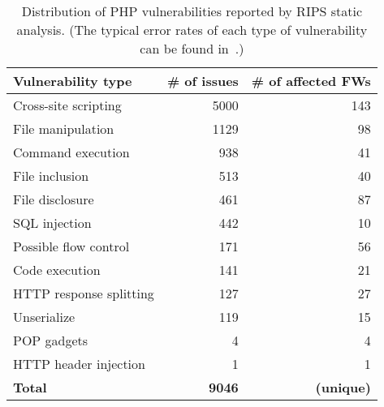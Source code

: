 \documentclass[conference]{./templates/ndss/IEEEtran}
\newcounter{t0d0_counter}
\newcounter{pr00f_counter}
\newcommand{\countfirmwarephpripstotal}{9046}
\newcommand{\countfirmwarephpripscodeexecution}{141}
\newcommand{\countfirmwarephpripshttpresponsesplitting}{127}
\newcommand{\countfirmwarephpripscommandexecution}{938}
\newcommand{\countfirmwarephpripsheaderinjection}{1}
\newcommand{\countfirmwarephpripspossibleflowcontrol}{171}
\newcommand{\countfirmwarephpripsunserialize}{119}
\newcommand{\countfirmwarephpripssqlinjection}{442}
\newcommand{\countfirmwarephpripspopgadgets}{4}
\newcommand{\countfirmwarephpripsfiledisclosure}{461}
\newcommand{\countfirmwarephpripsfilemanipulation}{1129}
\newcommand{\countfirmwarephpripsfileinclusion}{513}
\newcommand{\countfirmwarephpripscrosssitescripting}{5000}
\newcommand{\countfirmwarefilesphpripscodeexecution}{21}
\newcommand{\countfirmwarefilesphpripshttpresponsesplitting}{27}
\newcommand{\countfirmwarefilesphpripscommandexecution}{41}
\newcommand{\countfirmwarefilesphpripsheaderinjection}{1}
\newcommand{\countfirmwarefilesphpripspossibleflowcontrol}{56}
\newcommand{\countfirmwarefilesphpripsunserialize}{15}
\newcommand{\countfirmwarefilesphpripssqlinjection}{10}
\newcommand{\countfirmwarefilesphpripspopgadgets}{4}
\newcommand{\countfirmwarefilesphpripsfiledisclosure}{87}
\newcommand{\countfirmwarefilesphpripsfilemanipulation}{98}
\newcommand{\countfirmwarefilesphpripsfileinclusion}{40}
\newcommand{\countfirmwarefilesphpripscrosssitescripting}{143}
\begin{document}
\begin{table}[t]
\centering
\caption{
  Distribution of PHP vulnerabilities reported by RIPS static analysis. 
  (The typical error rates of each type of vulnerability
  can be found in~\cite{Dahse:rips:ndss14}.) 
}
\begin{tabular}{lrr}\\
\toprule


\textbf{Vulnerability type} & \textbf{\# of issues} & \textbf{\# of affected FWs} \\ \midrule

Cross-site scripting    & \countfirmwarephpripscrosssitescripting    & \countfirmwarefilesphpripscrosssitescripting     \\File manipulation       & \countfirmwarephpripsfilemanipulation      & \countfirmwarefilesphpripsfilemanipulation       \\Command execution       & \countfirmwarephpripscommandexecution      & \countfirmwarefilesphpripscommandexecution       \\File inclusion          & \countfirmwarephpripsfileinclusion         & \countfirmwarefilesphpripsfileinclusion          \\File disclosure         & \countfirmwarephpripsfiledisclosure        & \countfirmwarefilesphpripsfiledisclosure         \\SQL injection           & \countfirmwarephpripssqlinjection          & \countfirmwarefilesphpripssqlinjection           \\Possible flow control   & \countfirmwarephpripspossibleflowcontrol   & \countfirmwarefilesphpripspossibleflowcontrol    \\Code execution          & \countfirmwarephpripscodeexecution         & \countfirmwarefilesphpripscodeexecution          \\HTTP response splitting & \countfirmwarephpripshttpresponsesplitting & \countfirmwarefilesphpripshttpresponsesplitting  \\Unserialize             & \countfirmwarephpripsunserialize           & \countfirmwarefilesphpripsunserialize            \\POP gadgets             & \countfirmwarephpripspopgadgets            & \countfirmwarefilesphpripspopgadgets             \\HTTP header injection   & \countfirmwarephpripsheaderinjection       & \countfirmwarefilesphpripsheaderinjection        \\

\midrule

\textbf{Total}          & \textbf{\countfirmwarephpripstotal{}}                 & \textbf{\countfirmwarephpfwripsvuln{} (unique)} \\

\bottomrule

\end{tabular}
\label{tbl:vulns-php}
\end{table}
\end{document}
